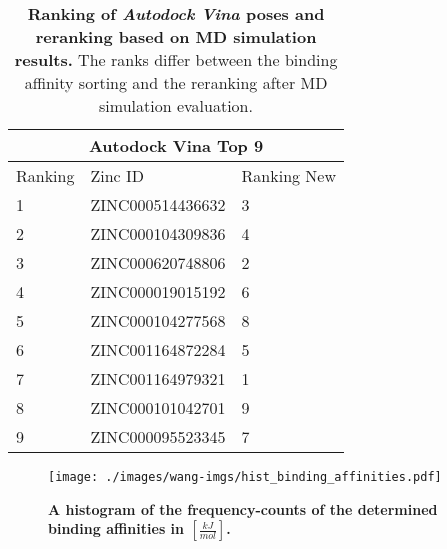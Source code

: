 \documentclass[11pt, letterpaper, titlepage]{article}
\begin{document}
\begin{table}[h!]
\caption{\textbf{Ranking of \emph{Autodock Vina} poses and reranking based on MD simulation results.} The ranks differ between the binding affinity sorting and the reranking after MD simulation evaluation. }
\centering 

\begin{tabular}{ |p{3.5cm}|| p{4.5cm}|| p{3.5cm}| }

\hline 

\multicolumn{3}{|c|}{Autodock Vina Top 9 } \\ 

\hline 

Ranking & Zinc ID & Ranking New \\ 

\hline 

1 & ZINC000514436632 & 3\\ 

2 & ZINC000104309836 & 4\\ 

3 & ZINC000620748806 & 2\\ 

4 & ZINC000019015192 & 6\\ 

5 & ZINC000104277568 & 8\\ 

6 & ZINC001164872284 & 5\\ 

7 & ZINC001164979321 & 1\\  

8 & ZINC000101042701 & 9\\ 

9 & ZINC000095523345 & 7\\ 

\hline 


\end{tabular} 



\label{table_zinc_results} 

\end{table} 


 \begin{figure}[h!]
    \centering
    \texttt{[image: ./images/wang-imgs/hist\_binding\_affinities.pdf]}
    \caption{\textbf{A histogram of the frequency-counts of the determined binding affinities in $[\frac{kJ}{mol}]$.}}
    \label{fig:hist_binding_affinities_our_zinc}
\end{figure}
\end{document}
